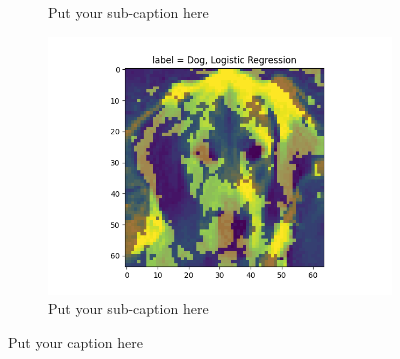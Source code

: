 \documentclass{article}
\begin{document}
\begin{figure}[H]
\begin{subfigure}{.33\textwidth}
  \caption{Put your sub-caption here}
  \label{}
\end{subfigure}
\begin{subfigure}{.33\textwidth}
  \centering
  \includegraphics[width=1\linewidth]{1e/Dogs 2 clusters/imp feat LogisticRegression.png}  
  \caption{Put your sub-caption here}
  \label{LogReg dog}
\end{subfigure}
\caption{Put your caption here}
\label{example dog}
\end{figure}
\end{document}
